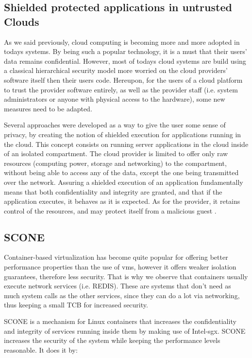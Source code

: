 \subsection{Shielded protected applications in untrusted Clouds}
\label{ssec:shieldedApps}

As we said previously, cloud computing is becoming more and more adopted in todays systems. 
By being such a popular technology, it is a must that their users' data remains confidential. 
However, most of todays cloud systems are build using a classical hierarchical security model more worried on the cloud providers' software itself then their users code. 
Hereupon, for the users of a cloud platform to trust the provider software entirely, as well as the provider staff (i.e. system administrators or anyone with physical access to the hardware), some new measures need to be adapted.

Several approaches were developed as a way to give the user some sense of privacy, by creating the notion of shielded execution for applications running in the cloud. 
This concept consists on running server applications in the cloud inside of an isolated compartment. The cloud provider is limited to offer only raw resources (computing power, storage and networking) to the compartment, without being able to access any of the  data, except the one being transmitted over the network. 
Assuring a shielded execution of an application fundamentally means that both confidentiality and integrity are granted, and that if the application executes, it behaves as it is expected. As for the provider, it retains control of the resources, and may protect itself from a malicious guest \cite{havenPaper}. 


\subsection{SCONE}
\label{ssec:scone}

Container-based virtualization has become quite popular for offering better performance properties than the use of \gls{vm}s, however it offers weaker isolation guarantees, therefore less security. 
That is why we observe that containers usually execute network services (i.e. REDIS). These are systems that don't need as much system calls as the other services, since they can do a lot via networking, thus keeping a small TCB for increased security.

SCONE \cite{sconePaper} is a mechanism for Linux containers that increases the confidentiality and integrity of services running inside them by making use of Intel-\gls{sgx}.
SCONE increases the security of the system while keeping the performance levels reasonable. 
It does it by: 

